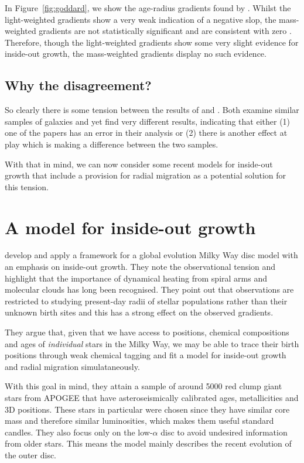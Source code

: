 \documentclass[preprint2]{aastex631}
\begin{document}
In Figure~\ref{fig:goddard}, we show the age-radius gradients found by \citet{Goddard+2017}. Whilst the light-weighted gradients show a very weak indication of a negative slop, the mass-weighted gradients are not statistically significant and are consistent with zero \citep[in agreement with][]{Sanchez-Blazquez+2014}. Therefore, though the light-weighted gradients show some very slight evidence for inside-out growth, the mass-weighted gradients display no such evidence.

\subsection{Why the disagreement?}
So clearly there is some tension between the results of \citet{vanDokkum+2013} and \citet{Goddard+2017}. Both examine similar samples of galaxies and yet find very different results, indicating that either (1) one of the papers has an error in their analysis or (2) there is another effect at play which is making a difference between the two samples.

With that in mind, we can now consider some recent models for inside-out growth that include a provision for radial migration as a potential solution for this tension.

\section{A model for inside-out growth}
\citet{Frankel+2019} develop and apply a framework for a global evolution Milky Way disc model with an emphasis on inside-out growth. They note the observational tension and highlight that the importance of dynamical heating from spiral arms and molecular clouds has long been recognised. They point out that observations are restricted to studying present-day radii of stellar populations rather than their unknown birth sites and this has a strong effect on the observed gradients.

They argue that, given that we have access to positions, chemical compositions and ages of \textit{individual} stars in the Milky Way, we may be able to trace their birth positions through weak chemical tagging and fit a model for inside-out growth and radial migration simulataneously.

With this goal in mind, they attain a sample of around 5000 red clump giant stars from APOGEE that have asteroseismically calibrated ages, metallicities and 3D positions. These stars in particular were chosen since they have similar core mass and therefore similar luminosities, which makes them useful standard candles. They also focus only on the low-$\alpha$ disc to avoid undesired information from older stars. This means the model mainly describes the recent evolution of the outer disc.
\end{document}
